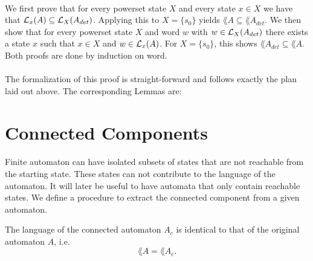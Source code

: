 \documentclass[11pt,a4paper,oneside]{book}
\begin{document}
                    \paragraph{}
                        We first prove that for every powerset state $X$ and every state $x \in X$ we have that $\mathcal{L}_x(A) \subseteq \mathcal{L}_X(A_{det})$. 
                        Applying this to $X=\{s_0\}$ yields $\lang{A} \subseteq \lang{A_{det}}$.
                        We then show that for every powerset state $X$ and word $w$ with $w \in \mathcal{L}_X(A_{det})$ there exists a state $x$ such that $x \in X$ and $w \in \mathcal{L}_x(A)$. 
                        For $X = \{s_0\}$, this shows $\lang{A_{det}} \subseteq \lang{A}$.
                        Both proofs are done by induction on word.

                    \paragraph{}
                        The formalization of this proof is straight-forward and follows exactly the plan laid out above. 
                        The corresponding Lemmas are:
                        \vspace{-0.4cm}
                        \vspace{-0.4cm}
                        

        \section{Connected Components}
            \paragraph{} 
                Finite automaton can have isolated subsets of states that are not reachable from the starting state. 
                These states can not contribute to the language of the automaton. 
                It will later be useful to have automata that only contain reachable states. 
                We define a procedure to extract the connected component from a given automaton.

            \begin{theorem}
                The language of the connected automaton $A_c$ is identical to that of the original automaton $A$, i.e.
                \[
                    \lang{A} = \lang{A_c}.
                \]
            \end{theorem}
            
\end{document}
